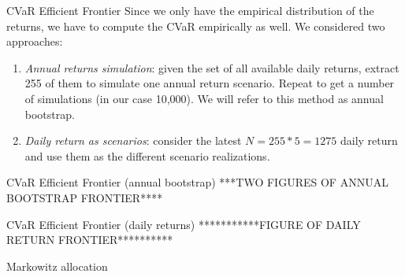 \documentclass{beamer}
\begin{document}
\begin{frame}{CVaR Efficient Frontier}
Since we only have the empirical distribution of the returns, we have to compute the CVaR empirically as well. We considered two approaches: 

\begin{enumerate}
	\item \textit{Annual returns simulation}: given the set of all available daily returns, extract 255 of them to simulate one annual return scenario. Repeat to get a number of simulations (in our case 10,000).
	We will refer to this method as annual bootstrap.
	\item \textit{Daily return as scenarios}: consider the latest $N = 255 * 5 = 1275$  daily return and use them as the different scenario realizations.
\end{enumerate}
\end{frame}

\begin{frame}{CVaR Efficient Frontier (annual bootstrap)}
***TWO FIGURES OF ANNUAL BOOTSTRAP FRONTIER****
\end{frame}

\begin{frame}{CVaR Efficient Frontier (daily returns)}
***********FIGURE OF DAILY RETURN FRONTIER**********
\end{frame}


\begin{frame}{Markowitz allocation}
\end{frame}
\end{document}
